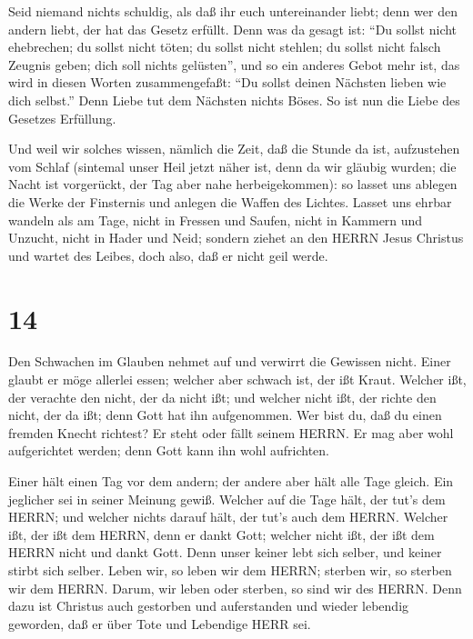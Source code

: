  Seid niemand nichts schuldig, als daß ihr euch
untereinander liebt; denn wer den andern liebt, der hat das Gesetz
erfüllt.  Denn was da gesagt ist: ``Du sollst nicht
ehebrechen; du sollst nicht töten; du sollst nicht stehlen; du sollst
nicht falsch Zeugnis geben; dich soll nichts gelüsten'', und so ein
anderes Gebot mehr ist, das wird in diesen Worten zusammengefaßt: ``Du
sollst deinen Nächsten lieben wie dich selbst.''  Denn
Liebe tut dem Nächsten nichts Böses. So ist nun die Liebe des Gesetzes
Erfüllung.

 Und weil wir solches wissen, nämlich die Zeit, daß die
Stunde da ist, aufzustehen vom Schlaf (sintemal unser Heil jetzt näher
ist, denn da wir gläubig wurden;  die Nacht ist vorgerückt,
der Tag aber nahe herbeigekommen): so lasset uns ablegen die Werke der
Finsternis und anlegen die Waffen des Lichtes.  Lasset uns
ehrbar wandeln als am Tage, nicht in Fressen und Saufen, nicht in
Kammern und Unzucht, nicht in Hader und Neid;  sondern
ziehet an den HERRN Jesus Christus und wartet des Leibes, doch also, daß
er nicht geil werde.

\hypertarget{section-13}{%
\section{14}\label{section-13}}

 Den Schwachen im Glauben nehmet auf und verwirrt die
Gewissen nicht.  Einer glaubt er möge allerlei essen;
welcher aber schwach ist, der ißt Kraut.  Welcher ißt, der
verachte den nicht, der da nicht ißt; und welcher nicht ißt, der richte
den nicht, der da ißt; denn Gott hat ihn aufgenommen.  Wer
bist du, daß du einen fremden Knecht richtest? Er steht oder fällt
seinem HERRN. Er mag aber wohl aufgerichtet werden; denn Gott kann ihn
wohl aufrichten.

 Einer hält einen Tag vor dem andern; der andere aber hält
alle Tage gleich. Ein jeglicher sei in seiner Meinung gewiß.
 Welcher auf die Tage hält, der tut's dem HERRN; und welcher
nichts darauf hält, der tut's auch dem HERRN. Welcher ißt, der ißt dem
HERRN, denn er dankt Gott; welcher nicht ißt, der ißt dem HERRN nicht
und dankt Gott.  Denn unser keiner lebt sich selber, und
keiner stirbt sich selber.  Leben wir, so leben wir dem
HERRN; sterben wir, so sterben wir dem HERRN. Darum, wir leben oder
sterben, so sind wir des HERRN.  Denn dazu ist Christus auch
gestorben und auferstanden und wieder lebendig geworden, daß er über
Tote und Lebendige HERR sei.

